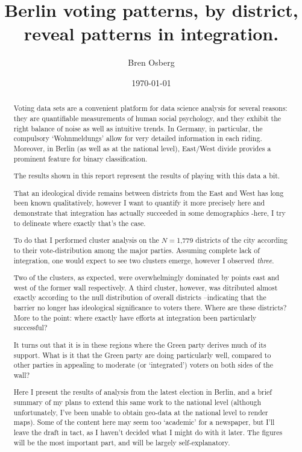 \documentclass[amsmath,amssymb,nofootinbib,12pt,preprint]{revtex4}
\begin{document}
\title{Berlin voting patterns, by district, reveal patterns in integration.   }
\author{Bren Osberg}

\date{\today}

\begin{abstract}

Voting data sets are a convenient platform for data science analysis for several reasons: they are quantifiable measurements of human social psychology, and they exhibit the right balance of noise as well as intuitive trends. In Germany, in particular, the compulsory `Wohnmeldungs' allow for very detailed information in each riding. Moreover, in Berlin (as well as at the national level), East/West divide provides a prominent feature for binary classification. 

The results shown in this report represent the results of playing with this data a bit.


That an ideological divide remains  between districts from the East and West has long been known qualitatively, however I want to  quantify it more precisely here and demonstrate that integration has actually succeeded in some demographics \--here, I try to delineate where exactly that's the case.

To do that I performed cluster analysis on the $N=$1,779 districts of the city according to their vote-distribution among the major parties. Assuming complete lack of integration, one would expect to see two clusters emerge, however I observed \emph{three}. 

Two of the clusters, as expected, were overwhelmingly dominated by points east and west of the former wall respectively. A third cluster, however, was ditributed almost exactly according to the null distribution of overall districts \---indicating that the barrier no longer has ideological significance to voters there. Where are these districts? More to the point: where exactly have efforts at integration been particularly successful? 

It turns out that it is in these regions where the Green party derives much of its support. What is it that the Green party are doing particularly well, compared to other parties in appealing to moderate (or `integrated') voters on both sides of the wall?

Here I present the results of analysis from the latest election in Berlin, and a brief summary of my plans to extend this same work to the national level (although unfortunately, I've been unable to obtain geo-data at the national level to render maps). Some of the content here may seem too `academic' for a newspaper, but I'll leave the draft in tact, as I haven't decided what I might do with it later. The figures will be the most important part, and will be largely self-explanatory.
\end{abstract}
\end{document}
